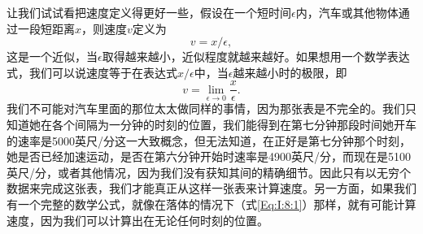 \documentclass[12pt,oneside]{book}
\begin{document}
让我们试试看把速度定义得更好一些，假设在一个短时间$\epsilon$内，汽车或其他物体通过一段短距离$x$，则速度$v$定义为
\begin{equation*}
v=x/\epsilon,
\end{equation*}
这是一个近似，当$\epsilon$取得越来越小，近似程度就越来越好。如果想用一个数学表达式，我们可以说速度等于在表达式$x/\epsilon$中，当$\epsilon$越来越小时的极限，即
\begin{equation}
\label{Eq:I:8:3}
v=\lim_{\epsilon\to0}\frac{x}{\epsilon}.
\end{equation}
我们不可能对汽车里面的那位太太做同样的事情，因为那张表是不完全的。我们只知道她在各个间隔为一分钟的时刻的位置，我们能得到在第七分钟那段时间她开车的速率是5000英尺/分这一大致概念，但无法知道，在正好是第七分钟那个时刻，她是否已经加速运动，是否在第六分钟开始时速率是4900英尺/分，而现在是5100英尺/分，或者其他情况，因为我们没有获知其间的精确细节。因此只有以无穷个数据来完成这张表，我们才能真正从这样一张表来计算速度。另一方面，如果我们有一个完整的数学公式，就像在落体的情况下（式\eqref{Eq:I:8:1}）那样，就有可能计算速度，因为我们可以计算出在无论任何时刻的位置。
\end{document}
